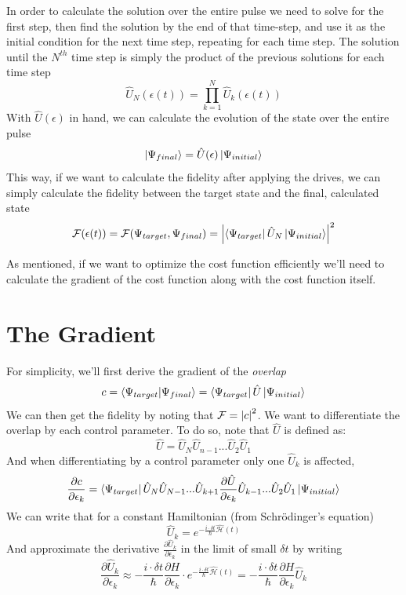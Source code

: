 In order to calculate the solution over the entire pulse we need to solve for the first step, then find the solution by the end of that time-step, and use it as the initial condition for the next time step, repeating for each time step. The solution until the $N^{th}$ time step is simply the product of the previous solutions for each time step
\begin{equation}\label{eq:U_def_prod}
\hat{U}_N (\epsilon (t)) = \prod_{k = 1}^N\hat{U}_k (\epsilon (t))
\end{equation}
With $\hat{U} (\epsilon)$ in hand, we can calculate the evolution of the state over the entire pulse
\begin{equation}
\ket{\Psi_{final}} = \hat{U} (\epsilon)\ket{\Psi_{initial}}
\end{equation}
This way, if we want to calculate the fidelity after applying the drives, we can simply calculate the fidelity between the target state and the final, calculated state
\begin{equation} \label{eq:fidelity_sim}
\mathcal{F} (\epsilon (t)) = \mathcal{F} (\Psi_{target}, \Psi_{final}) = \abs{\bra{\Psi_{target}}\hat{U}_N\ket{\Psi_{initial}}}^2
\end{equation}

As mentioned, if we want to optimize the cost function efficiently we'll need to calculate the gradient of the cost function along with the cost function itself.

\section{The Gradient}
For simplicity, we'll first derive the gradient of the \textit{overlap}
\begin{equation} \label{def:overlap}
c = \braket{\Psi_{target}}{\Psi_{final}} = \bra{\Psi_{target}}\hat{U}\ket{\Psi_{initial}}
\end{equation}
We can then get the fidelity by noting that $\mathcal{F} = \abs{c}^2$. We want to differentiate the overlap by each control parameter. To do so, note that $\hat{U}$ is defined as:
\[ 
\hat{U} = \hat{U}_N \hat{U}_{n-1}...\hat{U}_2 \hat{U}_1
\]
And when differentiating by a control parameter only one $\hat{U}_k$ is affected,
\[
\frac{\partial c}{\partial \epsilon_k} = \bra{\Psi_{target}}\hat{U}_N \hat{U}_{N-1} ... \hat{U}_{k+1}\frac{\partial \hat{U}}{\partial \epsilon_k} \hat{U}_{k-1} ...\hat{U}_2 \hat{U}_1\ket{\Psi_{initial}} 
\]
We can write that for a constant Hamiltonian (from Schr\"{o}dinger's equation)
\[
    \hat{U}_k = e^{-\frac{i\cdot \delta t}{\hslash}\hat{\mathcal{H}} (t)}
\]
And approximate the derivative $\frac{\partial \hat{U}_k}{\partial \epsilon_k}$ in the limit of small $\delta t$ by writing
\begin{equation*}
    \frac{\partial \hat{U}_k}{\partial \epsilon_k} \approx -\frac{i\cdot \delta t}{\hslash}\frac{\partial H}{\partial \epsilon_k} \cdot e^{-\frac{i\cdot \delta t}{\hslash}\hat{\mathcal{H}} (t)} = -\frac{i\cdot \delta t}{\hslash}\frac{\partial H}{\partial \epsilon_k} \hat{U}_k
\end{equation*}

